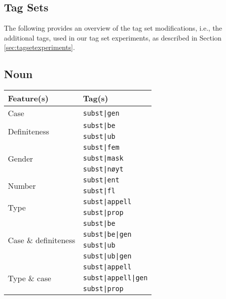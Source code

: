 \documentclass[a4paper,12pt,english]{book}
\begin{document}
\begin{appendices}
    \chapter{Tag Sets}
    \label{chap:apptagsets}
    The following provides an overview of the tag set modifications, i.e., the
    additional tags, used in our tag set experiments, as described in Section
    \ref{sec:tagsetexperiments}.

    \section{Noun}
    \begin{table}
        \centering
        \smaller[1]
        \begin{tabular}{@{}ll@{}}
            \toprule
            \textbf{Feature(s)} & \textbf{Tag(s)} \\
            \midrule
            Case & \texttt{subst|gen} \\
            \midrule
            \multirow{2}{*}{Definiteness}
            & \texttt{subst|be} \\
            & \texttt{subst|ub} \\
            \midrule
            \multirow{3}{*}{Gender}
            & \texttt{subst|fem} \\
            & \texttt{subst|mask} \\
            & \texttt{subst|nøyt} \\
            \midrule
            \multirow{2}{*}{Number}
            & \texttt{subst|ent} \\
            & \texttt{subst|fl} \\
            \midrule
            \multirow{2}{*}{Type}
            & \texttt{subst|appell} \\
            & \texttt{subst|prop} \\
            \midrule
            \multirow{4}{*}{Case \& definiteness}
            & \texttt{subst|be} \\
            & \texttt{subst|be|gen} \\
            & \texttt{subst|ub} \\
            & \texttt{subst|ub|gen} \\
            \midrule
            \multirow{4}{*}{Type \& case}
            & \texttt{subst|appell} \\
            & \texttt{subst|appell|gen} \\
            & \texttt{subst|prop} \\

\end{tabular}
\end{table}
\end{appendices}
\end{document}
